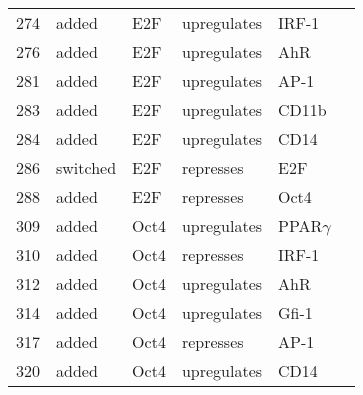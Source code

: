 \begin{center}
\begin{scriptsize}
\begin{supertabular}{|p{2 cm}|p{2cm}|p{3cm}|p{2.5cm}|p{2cm}|p{1.5cm}|}
274 &  added &  E2F  & upregulates &  IRF-1 & \\
276 &  added &  E2F  & upregulates &  AhR & \\
281 &  added &  E2F  & upregulates &  AP-1 & \\
283 &  added &  E2F  & upregulates &  CD11b & \\
284 &  added &  E2F  & upregulates &  CD14 & \\
286 &  switched &  E2F  & represses &  E2F & \\
288 &  added &  E2F  & represses &  Oct4 & \\
309 &  added &  Oct4  & upregulates &  PPAR$\gamma$ & \\
310 &  added &  Oct4  & represses &  IRF-1 & \\
312 &  added &  Oct4  & upregulates &  AhR & \\ 
314 &  added &  Oct4  & upregulates &  Gfi-1 & \\
317 &  added &  Oct4  & represses &  AP-1 & \\
320 &  added &  Oct4  & upregulates &  CD14 & \\

\hline
\end{supertabular}
\end{scriptsize}
\end{center}
%






